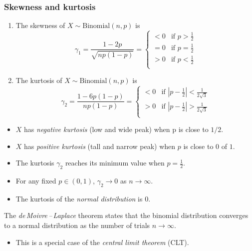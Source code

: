 \documentclass[lecture]{csm}
\def\it{\item}
\def\bit{\begin{itemize}}
\def\eit{\end{itemize}}
\def\ben{\begin{enumerate}}
\def\een{\end{enumerate}}
\begin{document}
\subsubsection*{Skewness and kurtosis}
\ben
\it The skewness of $X\sim\text{Binomial}(n,p)$ is
\[
\gamma_1 = \frac{1-2p}{\sqrt{np(1-p)}} = \begin{cases}
	< 0 	& \text{if } p > \frac{1}{2} \\
	= 0 	& \text{if } p = \frac{1}{2} \\
	> 0 	& \text{if } p < \frac{1}{2} \\
\end{cases}	
\]
\it The kurtosis of $X\sim\text{Binomial}(n,p)$ is
\[
\gamma_2 = \frac{1-6p(1-p)}{np(1-p)} = \begin{cases}
	< 0 				& \text{if } \left|p -\frac{1}{2}\right| < \frac{1}{2\sqrt{3}} \\
	> 0 				& \text{if } \left|p -\frac{1}{2}\right| > \frac{1}{2\sqrt{3}} \\
\end{cases}
\]
\een

\bit
\it $X$ has \emph{negative kurtosis} (low and wide peak) when p is close to $1/2$.
\it $X$ has \emph{positive kurtosis} (tall and narrow peak) when $p$ is close to $0$ of $1$.
\eit

\break %

\begin{remark}
\bit
\it The kurtosis $\gamma_2$ reaches its minimum value when $p=\frac{1}{2}$. 
\it For any fixed $p\in(0,1)$, $\gamma_2\to 0$ as $n\to\infty$.
\it The kurtosis of the \emph{normal distribution} is $0$.
\eit
\end{remark}

The \emph{de\,Moivre\,--\,Laplace} theorem states that the binomial distribution converges to a normal distribution as the number of trials $n\to\infty$.
\bit
\it This is a special case of the \emph{central limit theorem} (CLT).
\eit


\end{document}
